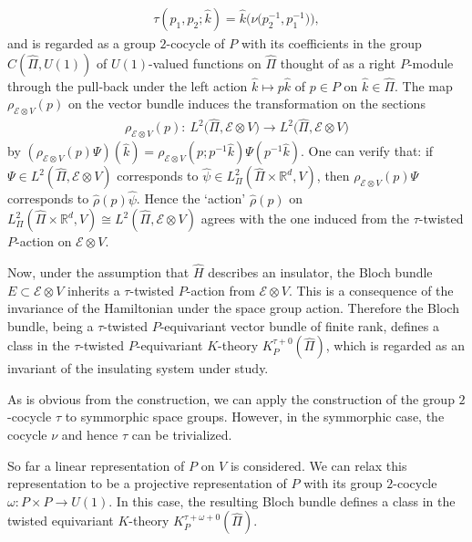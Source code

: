 \documentclass[pdftex]{sigma}
\theoremstyle{definition}
\newcommand{\R}{\mathbb{R}}
\begin{document}
\begin{gather*}
\tau(p_1, p_2; \hat{k}) = \hat{k}\big(\nu\big(p_2^{-1}, p_1^{-1}\big)\big),
\end{gather*}
and is regarded as a group $2$-cocycle of $P$ with its coef\/f\/icients in the group $C(\hat{\Pi}, U(1))$ of $U(1)$-valued functions on $\hat{\Pi}$ thought of as a right $P$-module through the pull-back under the left action $\hat{k} \mapsto p\hat{k}$ of $p \in P$ on $\hat{k} \in \hat{\Pi}$. The map $\rho_{\mathcal{E} \otimes V}(p)$ on the vector bundle induces the transformation on the sections
\begin{gather*}
\rho_{\mathcal{E} \otimes V}(p) \colon \ L^2\big(\hat{\Pi}, \mathcal{E} \otimes V\big)
\longrightarrow L^2\big(\hat{\Pi}, \mathcal{E} \otimes V\big)
\end{gather*}
by $(\rho_{\mathcal{E} \otimes V}(p)\Psi)(\hat{k}) = \rho_{\mathcal{E} \otimes V}(p; p^{-1}\hat{k})\Psi(p^{-1}\hat{k})$. One can verify that: if $\Psi \in L^2(\hat{\Pi}, \mathcal{E} \otimes V)$ corresponds to $\hat{\psi} \in L^2_{\Pi}(\hat{\Pi} \times \R^d, V)$, then $\rho_{\mathcal{E} \otimes V}(p) \Psi$ corresponds to $\hat{\rho}(p)\hat{\psi}$. Hence the `action' $\hat{\rho}(p)$ on $L^2_\Pi(\hat{\Pi} \times \R^d, V) \cong L^2(\hat{\Pi}, \mathcal{E} \otimes V)$ agrees with the one induced from the $\tau$-twisted $P$-action on $\mathcal{E} \otimes V$.

Now, under the assumption that $\hat{H}$ describes an insulator, the Bloch bundle $E \subset \mathcal{E} \otimes V$ inherits a $\tau$-twisted $P$-action from $\mathcal{E} \otimes V$. This is a consequence of the invariance of the Hamiltonian under the space group action. Therefore the Bloch bundle, being a $\tau$-twisted $P$-equivariant vector bundle of f\/inite rank, def\/ines a class in the $\tau$-twisted $P$-equivariant $K$-theory $K^{\tau + 0}_P(\hat{\Pi})$, which is regarded as an invariant of the insulating system under study.

As is obvious from the construction, we can apply the construction of the group $2$-cocycle $\tau$ to symmorphic space groups. However, in the symmorphic case, the cocycle $\nu$ and hence $\tau$ can be trivialized.

So far a linear representation of $P$ on $V$ is considered. We can relax this representation to be a projective representation of $P$ with its group $2$-cocycle $\omega \colon P \times P \to U(1)$. In this case, the resulting Bloch bundle def\/ines a class in the twisted equivariant $K$-theory $K^{\tau + \omega + 0}_P(\hat{\Pi})$.
\end{document}

